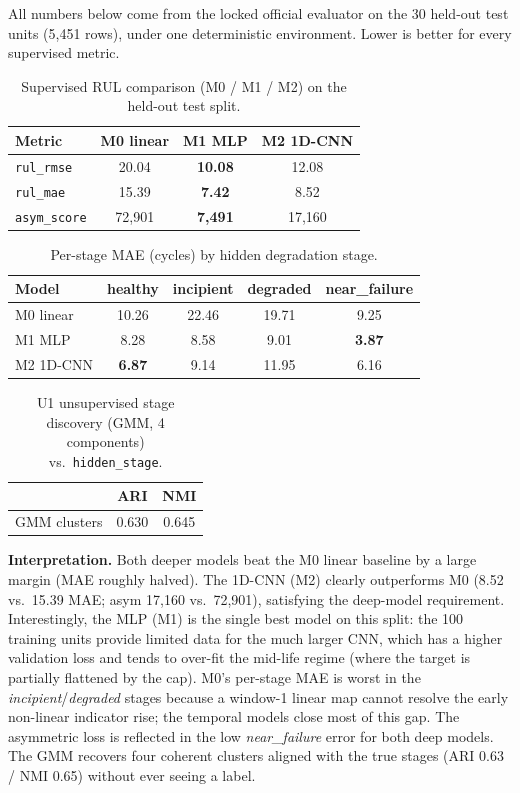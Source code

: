 \documentclass[11pt,a4paper]{article}
\newcommand{\code}[1]{\texttt{\small #1}}
\begin{document}
All numbers below come from the locked official evaluator on the 30 held-out
test units (5{,}451 rows), under one deterministic environment. Lower is better
for every supervised metric.

\begin{table}[h]
\centering
\caption{Supervised RUL comparison (M0 / M1 / M2) on the held-out test split.}
\begin{tabular}{l c c c}
\toprule
Metric & M0 linear & M1 MLP & M2 1D-CNN\\
\midrule
\code{rul\_rmse}   & 20.04 & \textbf{10.08} & 12.08\\
\code{rul\_mae}    & 15.39 & \textbf{7.42}  & 8.52\\
\code{asym\_score} & 72{,}901 & \textbf{7{,}491} & 17{,}160\\
\bottomrule
\end{tabular}
\end{table}

\begin{table}[h]
\centering
\caption{Per-stage MAE (cycles) by hidden degradation stage.}
\begin{tabular}{l c c c c}
\toprule
Model & healthy & incipient & degraded & near\_failure\\
\midrule
M0 linear & 10.26 & 22.46 & 19.71 & 9.25\\
M1 MLP    & 8.28  & 8.58  & 9.01  & \textbf{3.87}\\
M2 1D-CNN & \textbf{6.87} & 9.14 & 11.95 & 6.16\\
\bottomrule
\end{tabular}
\end{table}

\begin{table}[h]
\centering
\caption{U1 unsupervised stage discovery (GMM, 4 components) vs.\ \code{hidden\_stage}.}
\begin{tabular}{l c c}
\toprule
 & ARI & NMI\\
\midrule
GMM clusters & 0.630 & 0.645\\
\bottomrule
\end{tabular}
\end{table}

\textbf{Interpretation.} Both deeper models beat the M0 linear baseline by a
large margin (MAE roughly halved). The 1D-CNN (M2) clearly outperforms M0
(8.52 vs.\ 15.39 MAE; asym 17{,}160 vs.\ 72{,}901), satisfying the deep-model
requirement. Interestingly, the MLP (M1) is the single best model on this split:
the 100 training units provide limited data for the much larger CNN, which has
a higher validation loss and tends to over-fit the mid-life regime (where the
target is partially flattened by the cap). M0's per-stage MAE is worst in the
\emph{incipient}/\emph{degraded} stages because a window-1 linear map cannot
resolve the early non-linear indicator rise; the temporal models close most of
this gap. The asymmetric loss is reflected in the low \emph{near\_failure} error
for both deep models. The GMM recovers four coherent clusters aligned with the
true stages (ARI 0.63 / NMI 0.65) without ever seeing a label.
\end{document}
